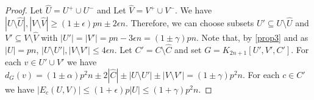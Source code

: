 \begin{proof}
Let $\hat U=U^+\cup U^-$ and Let $\hat V=V^+\cup V^-$. We have $|U\setminus \hat U|, |V\setminus \hat V| \geq (1\pm \epsilon)pn\pm 2\epsilon n$. Therefore, we can choose subsets $U'\subseteq U\setminus \hat U$ and $V'\subseteq V\setminus \hat V$ with $|U'|=|V'|= pn-3\epsilon n=(1\pm \gamma)pn$. Note that, by \ref{prop3} and as $|U|=pn$, $|U\setminus U'|,|V\setminus V'|\leq 4\epsilon n$.
Let  $C'=C\setminus \hat C$ and set $G=K_{2n+1}[U',V',C']$.
For each $v\in U'\cup V'$ we have $d_G(v)= (1\pm \alpha)p^2 n \pm 2|\hat C|\pm |U\setminus U'|\pm |V\setminus V'|=(1\pm \gamma)p^2 n$. For each $c\in C'$ we have $|E_c(U,V)|\leq (1+ \epsilon)p|U|\leq (1+ \gamma)p^2n$.
\end{proof}













